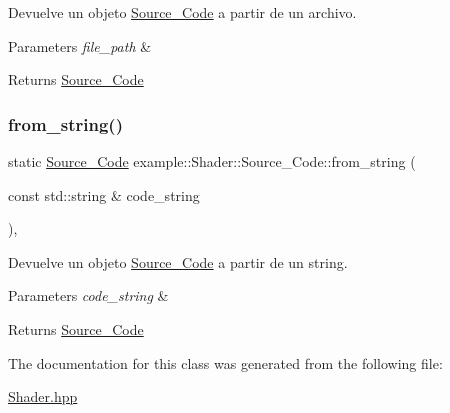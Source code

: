 Devuelve un objeto \mbox{\hyperlink{classexample_1_1_shader_1_1_source___code}{Source\+\_\+\+Code}} a partir de un archivo. 


\begin{DoxyParams}{Parameters}
{\em file\+\_\+path} & \\
\hline
\end{DoxyParams}
\begin{DoxyReturn}{Returns}
\mbox{\hyperlink{classexample_1_1_shader_1_1_source___code}{Source\+\_\+\+Code}} 
\end{DoxyReturn}
\mbox{\label{classexample_1_1_shader_1_1_source___code_a81c2e0da8c100613612f9e78302d74d3}} 
\subsubsection{\texorpdfstring{from\_string()}{from\_string()}}
{\footnotesize\ttfamily static \mbox{\hyperlink{classexample_1_1_shader_1_1_source___code}{Source\+\_\+\+Code}} example\+::\+Shader\+::\+Source\+\_\+\+Code\+::from\+\_\+string (\begin{DoxyParamCaption}\item[{const std\+::string \&}]{code\+\_\+string }\end{DoxyParamCaption})\hspace{0.3cm}{\ttfamily [inline]}, {\ttfamily [static]}}



Devuelve un objeto \mbox{\hyperlink{classexample_1_1_shader_1_1_source___code}{Source\+\_\+\+Code}} a partir de un string. 


\begin{DoxyParams}{Parameters}
{\em code\+\_\+string} & \\
\hline
\end{DoxyParams}
\begin{DoxyReturn}{Returns}
\mbox{\hyperlink{classexample_1_1_shader_1_1_source___code}{Source\+\_\+\+Code}} 
\end{DoxyReturn}


The documentation for this class was generated from the following file\+:\begin{DoxyCompactItemize}
\item 
\mbox{\hyperlink{_shader_8hpp}{Shader.\+hpp}}\end{DoxyCompactItemize}
